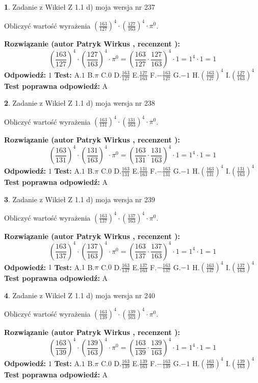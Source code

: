 \documentclass[12pt, a4paper]{article}
\theoremstyle{definition} %
\newtheorem{zad}{}
\newcommand{\zadStart}[1]{\begin{zad}#1\newline}
\newcommand{\zadStop}{\end{zad}}
\newcommand{\rozwStart}[2]{\noindent \textbf{Rozwiązanie (autor #1 , recenzent #2): }\newline}
\newcommand{\rozwStop}{\newline}
\newcommand{\odpStart}{\noindent \textbf{Odpowiedź:}\newline}
\newcommand{\odpStop}{\newline}
\newcommand{\testStart}{\noindent \textbf{Test:}\newline}
\newcommand{\testStop}{\newline}
\newcommand{\kluczStart}{\noindent \textbf{Test poprawna odpowiedź:}\newline}
\newcommand{\kluczStop}{\newline}
\begin{document}
\zadStart{Zadanie z Wikieł Z 1.1 d) moja wersja nr 237}

Obliczyć wartość wyrażenia $(\frac{163}{127})^{4} \cdot (\frac{127}{163})^{4} \cdot \pi^{0}$.
\zadStop
\rozwStart{Patryk Wirkus}{}
$$(\frac{163}{127})^{4} \cdot (\frac{127}{163})^{4} \cdot \pi^{0} = (\frac{163}{127} \cdot \frac{127}{163})^{4} \cdot 1 = 1^{4} \cdot 1 = 1$$
\rozwStop
\odpStart
$1$
\odpStop
\testStart
A.$1$ B.$\pi$ C.$0$ D.$\frac{163}{127}$ E.$\frac{127}{163}$
F.$-\frac{163}{127}$ G.$-1$
H.$(\frac{163}{127})^{4}$
I.$(\frac{127}{163})^{4}$
\testStop
\kluczStart
A
\kluczStop



\zadStart{Zadanie z Wikieł Z 1.1 d) moja wersja nr 238}

Obliczyć wartość wyrażenia $(\frac{163}{131})^{4} \cdot (\frac{131}{163})^{4} \cdot \pi^{0}$.
\zadStop
\rozwStart{Patryk Wirkus}{}
$$(\frac{163}{131})^{4} \cdot (\frac{131}{163})^{4} \cdot \pi^{0} = (\frac{163}{131} \cdot \frac{131}{163})^{4} \cdot 1 = 1^{4} \cdot 1 = 1$$
\rozwStop
\odpStart
$1$
\odpStop
\testStart
A.$1$ B.$\pi$ C.$0$ D.$\frac{163}{131}$ E.$\frac{131}{163}$
F.$-\frac{163}{131}$ G.$-1$
H.$(\frac{163}{131})^{4}$
I.$(\frac{131}{163})^{4}$
\testStop
\kluczStart
A
\kluczStop



\zadStart{Zadanie z Wikieł Z 1.1 d) moja wersja nr 239}

Obliczyć wartość wyrażenia $(\frac{163}{137})^{4} \cdot (\frac{137}{163})^{4} \cdot \pi^{0}$.
\zadStop
\rozwStart{Patryk Wirkus}{}
$$(\frac{163}{137})^{4} \cdot (\frac{137}{163})^{4} \cdot \pi^{0} = (\frac{163}{137} \cdot \frac{137}{163})^{4} \cdot 1 = 1^{4} \cdot 1 = 1$$
\rozwStop
\odpStart
$1$
\odpStop
\testStart
A.$1$ B.$\pi$ C.$0$ D.$\frac{163}{137}$ E.$\frac{137}{163}$
F.$-\frac{163}{137}$ G.$-1$
H.$(\frac{163}{137})^{4}$
I.$(\frac{137}{163})^{4}$
\testStop
\kluczStart
A
\kluczStop



\zadStart{Zadanie z Wikieł Z 1.1 d) moja wersja nr 240}

Obliczyć wartość wyrażenia $(\frac{163}{139})^{4} \cdot (\frac{139}{163})^{4} \cdot \pi^{0}$.
\zadStop
\rozwStart{Patryk Wirkus}{}
$$(\frac{163}{139})^{4} \cdot (\frac{139}{163})^{4} \cdot \pi^{0} = (\frac{163}{139} \cdot \frac{139}{163})^{4} \cdot 1 = 1^{4} \cdot 1 = 1$$
\rozwStop
\odpStart
$1$
\odpStop
\testStart
A.$1$ B.$\pi$ C.$0$ D.$\frac{163}{139}$ E.$\frac{139}{163}$
F.$-\frac{163}{139}$ G.$-1$
H.$(\frac{163}{139})^{4}$
I.$(\frac{139}{163})^{4}$
\testStop
\kluczStart
A
\kluczStop
\end{document}
